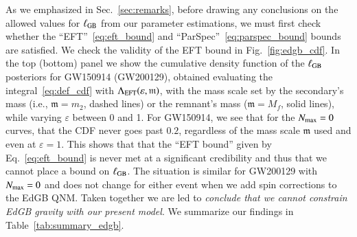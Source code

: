 \documentclass[twocolumn,
               prd,
               aps,
               superscriptaddress,
               tightenlines,
               nofootinbib,
               eqsecnum,
               amsfonts,
               amsmath,
               longbibliography]{revtex4-1}
\begin{document}
As we emphasized in Sec.~\ref{sec:remarks}, before drawing any conclusions on
the allowed values for $\ell_{\rm GB}$ from our parameter estimations, we
must first check whether the ``EFT''~\eqref{eq:eft_bound} and
``ParSpec''~\eqref{eq:parspec_bound} bounds are satisfied.
%
We check the validity of the EFT bound in Fig.~\ref{fig:edgb_cdf}. In the top (bottom) panel we show
the cumulative density function of the $\ell_{\rm GB}$ posteriors for GW150914 (GW200129), obtained
evaluating the integral~\eqref{eq:def_cdf} with $\Lambda_{\rm EFT}(\varepsilon, \mathfrak{m})$,
with the mass scale set by the secondary's mass (i.e., $\mathfrak{m} = m_2$, dashed lines) or
the remnant's mass ($\mathfrak{m} = M_f$, solid lines), while varying $\varepsilon$ between 0 and 1.
%
For GW150914, we see that for the $N_{\rm max} = 0$ curves, that the CDF never goes
past $0.2$, regardless of the mass scale $\mathfrak{m}$ used and even at $\varepsilon =
1$. This shows that that the ``EFT bound'' given by Eq.~\eqref{eq:eft_bound} is
never met at a significant credibility and thus that we cannot place a bound on
$\ell_{\rm GB}$.
%
The situation is similar for GW200129 with $N_{\rm max} = 0$ and does not
change for either event when we add spin corrections to the EdGB QNM.
%
Taken together we are led to \emph{conclude that we cannot constrain EdGB gravity with our
present model}.
%
We summarize our findings in Table~\ref{tab:summary_edgb}.
\end{document}
